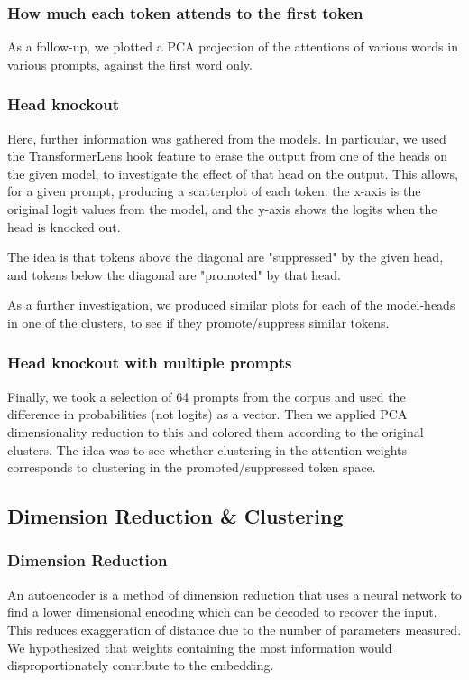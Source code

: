 \documentclass{article}
\begin{document}
\subsubsection{How much each token attends to the first token}
As a follow-up, we plotted a PCA projection of the attentions of various words in various prompts, against the first word only.

\subsubsection{Head knockout}
Here, further information was gathered from the models. In particular, we used the TransformerLens hook feature to erase the output from one of the heads on the given model, to investigate the effect of that head on the output. This allows, for a given prompt, producing a scatterplot of each token: the x-axis is the original logit values from the model, and the y-axis shows the logits when the head is knocked out.

The idea is that tokens above the diagonal are "suppressed" by the given head, and tokens below the diagonal are "promoted" by that head.

As a further investigation, we produced similar plots for each of the model-heads in one of the clusters, to see if they promote/suppress similar tokens.

\subsubsection{Head knockout with multiple prompts}
Finally, we took a selection of 64 prompts from the corpus and used the difference in probabilities (not logits) as a vector. Then we applied PCA dimensionality reduction to this and colored them according to the original clusters. The idea was to see whether clustering in the attention weights corresponds to clustering in the promoted/suppressed token space.

\subsection{Dimension Reduction \& Clustering}

\subsubsection{Dimension Reduction}

An autoencoder is a method of dimension reduction that uses a neural network to find a lower dimensional encoding which can be decoded to recover the input. This reduces exaggeration of distance due to the number of parameters measured. We hypothesized that weights containing the most information would disproportionately contribute to the embedding.
\end{document}
